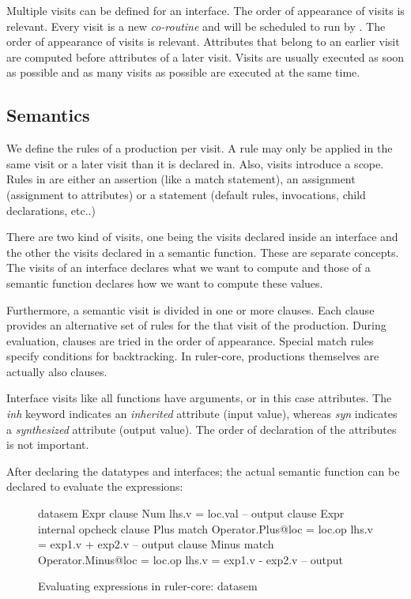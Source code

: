 Multiple visits can be defined for an interface. The order of appearance of visits is relevant. Every visit is a new \emph{co-routine} and will be scheduled to run by \rcore. The order of appearance of visits is relevant. Attributes that belong to an earlier visit are computed before attributes of a later visit. Visits are usually executed as soon as possible and as many visits as possible are executed at the same time. %

\subsection{Semantics}
We define the rules of a production per visit. A rule may only be applied in the same visit or a later visit than it is declared in. Also, visits introduce a scope.
Rules in \rcore are either an assertion (like a match statement), an assignment (assignment to attributes) or a statement (default rules, invocations, child declarations, etc..)

There are two kind of visits, one being the visits declared inside an interface and the other the visits declared in a semantic function. These are separate concepts. The visits of an interface declares what we want to compute and those of a semantic function declares how we want to compute these values.

Furthermore, a semantic visit is divided in one or more clauses. Each clause provides an alternative set of rules for the that visit of the production. During evaluation, clauses are tried in the order of appearance. Special match rules specify conditions for backtracking.
In ruler-core, productions themselves are actually also clauses.

Interface visits like all functions have arguments, or in this case attributes. The \emph{inh} keyword indicates an \emph{inherited} attribute (input value), whereas \emph{syn} indicates a \emph{synthesized} attribute (output value). The order of declaration of the attributes is not important.

After declaring the datatypes and interfaces; the actual semantic function can be declared to evaluate the expressions:

\begin{figure}[H]
\begin{code}
datasem Expr
   clause Num
     lhs.v = loc.val -- output
   clause Expr
     internal opcheck
       clause Plus
         match Operator.Plus@loc = loc.op
         lhs.v = exp1.v + exp2.v -- output
       clause Minus
         match Operator.Minus@loc = loc.op
         lhs.v = exp1.v - exp2.v -- output
\end{code}
\caption{Evaluating expressions in ruler-core: datasem}
\label{example:tutorial1:datasem}
\end{figure}

